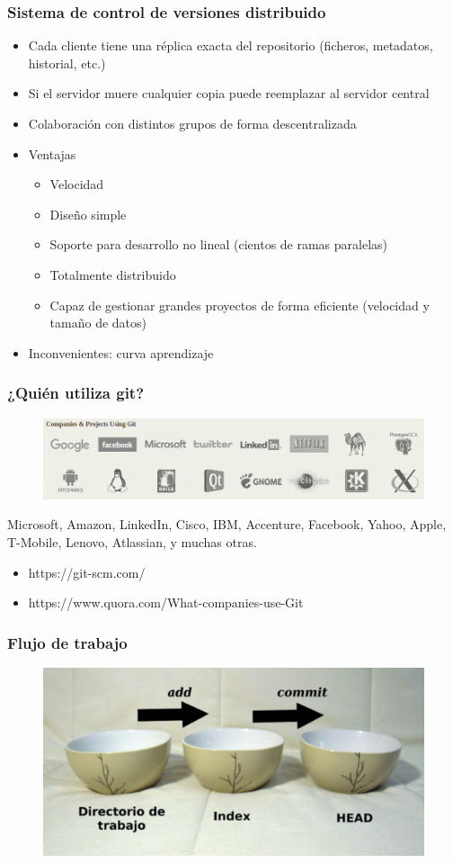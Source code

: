 \documentclass{beamer}
\begin{document}
\begin{frame}
\frametitle{Sistema de control de versiones distribuido}
\begin{itemize}
\item Cada cliente tiene una réplica exacta del repositorio (ficheros, metadatos, historial, etc.)
\item Si el servidor muere cualquier copia puede reemplazar al servidor central
\item Colaboración con distintos grupos de forma descentralizada
\item Ventajas
\begin{itemize}
\item Velocidad
\item Diseño simple
\item Soporte para desarrollo no lineal (cientos de ramas paralelas)
\item Totalmente distribuido
\item Capaz de gestionar grandes proyectos de forma eficiente (velocidad y tamaño de datos)
\end{itemize}
\item Inconvenientes: curva aprendizaje
\end{itemize}
\end{frame}

\begin{frame}
\frametitle{¿Quién utiliza git?}
\begin{figure}
\includegraphics[width=0.95\linewidth]{img/who.png}
\end{figure}
\vskip 0.5cm
\small
Microsoft, Amazon, LinkedIn, Cisco, IBM, Accenture, Facebook, Yahoo, Apple, T-Mobile, Lenovo, Atlassian, y muchas otras.
\small
\begin{itemize}
\item https://git-scm.com/
\item https://www.quora.com/What-companies-use-Git
\end{itemize}
\end{frame}

\begin{frame}
\frametitle{Flujo de trabajo}
\begin{figure}
\includegraphics[width=0.8\linewidth]{img/cuencos.png}
\end{figure}
\end{frame}
\end{document}
